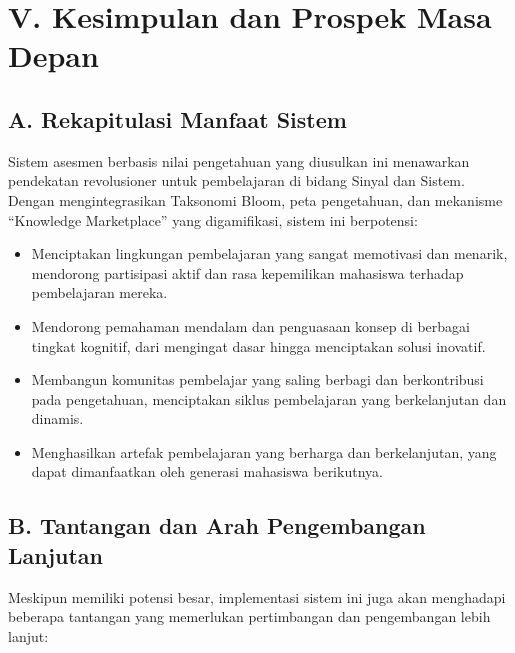 \documentclass[
  letterpaper,
  DIV=11,
  numbers=noendperiod]{scrreprt}
\begin{document}
\section{V. Kesimpulan dan Prospek Masa
Depan}\label{v.-kesimpulan-dan-prospek-masa-depan}

\subsection{A. Rekapitulasi Manfaat
Sistem}\label{a.-rekapitulasi-manfaat-sistem}

Sistem asesmen berbasis nilai pengetahuan yang diusulkan ini menawarkan
pendekatan revolusioner untuk pembelajaran di bidang Sinyal dan Sistem.
Dengan mengintegrasikan Taksonomi Bloom, peta pengetahuan, dan mekanisme
``Knowledge Marketplace'' yang digamifikasi, sistem ini berpotensi:

\begin{itemize}
\item
  Menciptakan lingkungan pembelajaran yang sangat memotivasi dan
  menarik, mendorong partisipasi aktif dan rasa kepemilikan mahasiswa
  terhadap pembelajaran mereka.
\item
  Mendorong pemahaman mendalam dan penguasaan konsep di berbagai tingkat
  kognitif, dari mengingat dasar hingga menciptakan solusi inovatif.
\item
  Membangun komunitas pembelajar yang saling berbagi dan berkontribusi
  pada pengetahuan, menciptakan siklus pembelajaran yang berkelanjutan
  dan dinamis.
\item
  Menghasilkan artefak pembelajaran yang berharga dan berkelanjutan,
  yang dapat dimanfaatkan oleh generasi mahasiswa berikutnya.
\end{itemize}

\subsection{B. Tantangan dan Arah Pengembangan
Lanjutan}\label{b.-tantangan-dan-arah-pengembangan-lanjutan}

Meskipun memiliki potensi besar, implementasi sistem ini juga akan
menghadapi beberapa tantangan yang memerlukan pertimbangan dan
pengembangan lebih lanjut:
\end{document}
